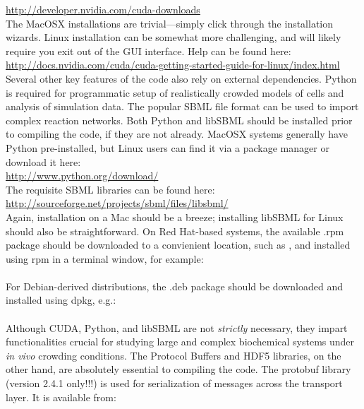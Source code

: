 \url{http://developer.nvidia.com/cuda-downloads}\\

The MacOSX installations are trivial---simply click through the installation wizards.  Linux installation can be somewhat more challenging, and will likely require you exit out of the GUI interface.  Help can be found here:\\

\url{http://docs.nvidia.com/cuda/cuda-getting-started-guide-for-linux/index.html}\\

Several other key features of the code also rely on external dependencies.  Python is required for programmatic setup of realistically crowded models of cells and analysis of simulation data.  The popular SBML file format can be used to import complex reaction networks. Both Python and libSBML should be installed prior to compiling the code, if they are not already.  MacOSX systems generally have Python pre-installed, but Linux users can find it via a package manager or download it here:\\

\url{http://www.python.org/download/}\\

The requisite SBML libraries can be found here:\\

\url{http://sourceforge.net/projects/sbml/files/libsbml/}\\

Again, installation on a Mac should be a breeze; installing libSBML for Linux should also be straightforward.  On Red Hat-based systems, the available .rpm package should be downloaded to a convienient location, such as , and installed using rpm in a terminal window, for example:\\

\\

For Debian-derived distributions, the .deb package should be downloaded and installed using dpkg, e.g.:\\

\\

Although CUDA, Python, and libSBML are not {\it strictly} necessary, they impart functionalities crucial for studying large and complex biochemical systems under {\it in vivo} crowding conditions.  The Protocol Buffers and HDF5 libraries, on the other hand, are absolutely essential to compiling the code.  The protobuf library (version 2.4.1 only!!!) is used for serialization of messages across the transport layer. It is available from:\\

